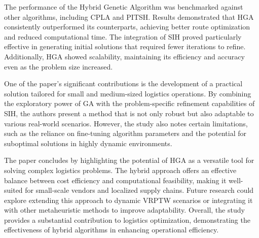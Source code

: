 The performance of the Hybrid Genetic Algorithm was benchmarked against other algorithms, including CPLA and PITSH. Results demonstrated that HGA consistently outperformed its counterparts, achieving better route optimization and reduced computational time. The integration of SIH proved particularly effective in generating initial solutions that required fewer iterations to refine. Additionally, HGA showed scalability, maintaining its efficiency and accuracy even as the problem size increased.

One of the paper’s significant contributions is the development of a practical solution tailored for small and medium-sized logistics operations. By combining the exploratory power of GA with the problem-specific refinement capabilities of SIH, the authors present a method that is not only robust but also adaptable to various real-world scenarios. However, the study also notes certain limitations, such as the reliance on fine-tuning algorithm parameters and the potential for suboptimal solutions in highly dynamic environments.

The paper concludes by highlighting the potential of HGA as a versatile tool for solving complex logistics problems. The hybrid approach offers an effective balance between cost efficiency and computational feasibility, making it well-suited for small-scale vendors and localized supply chains. Future research could explore extending this approach to dynamic VRPTW scenarios or integrating it with other metaheuristic methods to improve adaptability. Overall, the study provides a substantial contribution to logistics optimization, demonstrating the effectiveness of hybrid algorithms in enhancing operational efficiency.
